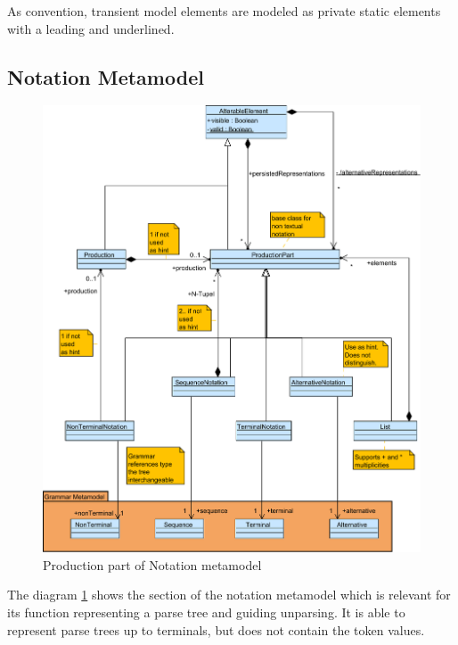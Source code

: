 As convention, transient model elements are modeled as private static elements with a leading \code{-} and underlined.


\subsection{Notation Metamodel}
\begin{figure}
\centering
\includegraphics[scale=0.65]{gfx/ex/Notation_Prod} 
\caption{Production part of Notation metamodel}
\label{MM:Not:Prod}
\end{figure}

The diagram \ref{MM:Not:Prod} shows the section of the notation metamodel which is relevant for its function representing a parse tree and guiding unparsing. It is able to represent parse trees up to terminals, but does not contain the token values.\\

